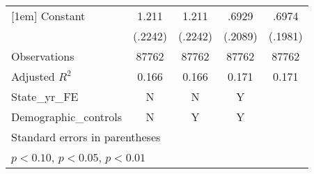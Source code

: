 \begin{table}[htbp]
\begin{tabular}{l*{4}{c}}
[1em]
Constant            &       1.211\sym{***}&       1.211\sym{***}&       .6929\sym{***}&       .6974\sym{***}\\
                    &     (.2242)         &     (.2242)         &     (.2089)         &     (.1981)         \\
\hline
Observations        &       87762         &       87762         &       87762         &       87762         \\
Adjusted \(R^{2}\)  &       0.166         &       0.166         &       0.171         &       0.171         \\
State\_yr\_FE         &           N         &           N         &           Y         &                     \\
Demographic\_controls&           N         &           Y         &           Y         &                     \\
\hline\hline
\multicolumn{5}{l}{\footnotesize Standard errors in parentheses}\\
\multicolumn{5}{l}{\footnotesize \sym{*} \(p<0.10\), \sym{**} \(p<0.05\), \sym{***} \(p<0.01\)}\\
\end{tabular}
\end{table}
